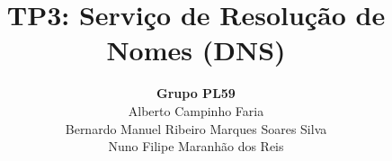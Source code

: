\documentclass{llncs}
\begin{document}
\mainmatter

\title{TP3: Serviço de Resolução de Nomes (DNS)}

\author{
  {\bfseries Grupo PL59} \\
  Alberto Campinho Faria \\
  Bernardo Manuel Ribeiro Marques Soares Silva \\
  Nuno Filipe Maranhão dos Reis
  }


\date{}

\maketitle



% 

\end{document}
